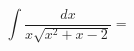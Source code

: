 \documentclass[../rgr1.tex]{subfiles}
\begin{document}

\Solution

\begin{equation}
	\int \frac{dx}{x \sqrt{x^2 + x - 2} } =
\end{equation}

\Answer{
	<++>
}
\end{document}
